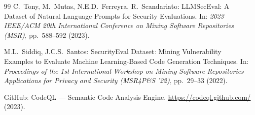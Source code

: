 \documentclass[runningheads]{llncs}
\begin{document}
\begin{thebibliography}{99}
C.\ Tony, M.\ Mutas, N.E.D.\ Ferreyra, R.\ Scandariato:
LLMSecEval: A Dataset of Natural Language Prompts for Security Evaluations.
In: \textit{2023 IEEE/ACM 20th International Conference on Mining Software Repositories (MSR)}, pp.\ 588--592 (2023).

M.L.\ Siddiq, J.C.S.\ Santos:
SecurityEval Dataset: Mining Vulnerability Examples to Evaluate Machine Learning-Based Code Generation Techniques.
In: \textit{Proceedings of the 1st International Workshop on Mining Software Repositories Applications for Privacy and Security (MSR4P\&S '22)}, pp.\ 29--33 (2022).

GitHub:
CodeQL --- Semantic Code Analysis Engine.
\url{https://codeql.github.com/} (2023).

\end{thebibliography}
\end{document}
